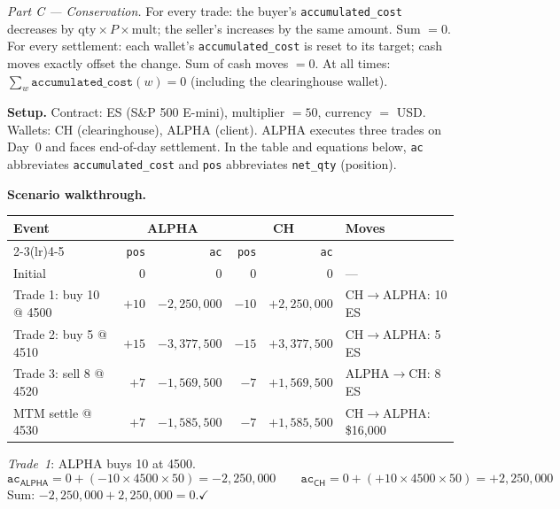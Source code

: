 \documentclass[11pt,a4paper]{article}
\begin{document}
\smallskip
\noindent\emph{Part C --- Conservation.}
For every trade: the buyer's \texttt{accumulated\_cost} decreases by $\text{qty} \times P \times \text{mult}$; the seller's increases by the same amount.  Sum $= 0$.
For every settlement: each wallet's \texttt{accumulated\_cost} is reset to its target; cash moves exactly offset the change.  Sum of cash moves $= 0$.
At all times: $\sum_w \texttt{accumulated\_cost}(w) = 0$ (including the clearinghouse wallet).

\medskip
\noindent\textbf{Setup.}
Contract: ES (S\&P 500 E-mini), multiplier $= 50$, currency $=$ USD.
Wallets: \textsf{CH} (clearinghouse), \textsf{ALPHA} (client).
ALPHA executes three trades on Day~0 and faces end-of-day settlement.
In the table and equations below, \texttt{ac} abbreviates \texttt{accumulated\_cost} and \texttt{pos} abbreviates \texttt{net\_qty} (position).

\medskip
\noindent\textbf{Scenario walkthrough.}

\begin{center}
\small
\begin{tabular}{@{}lrrrrl@{}}
\toprule
\textbf{Event} & \multicolumn{2}{c}{\textsf{ALPHA}} & \multicolumn{2}{c}{\textsf{CH}} & \textbf{Moves} \\
\cmidrule(lr){2-3}\cmidrule(lr){4-5}
 & \texttt{pos} & \texttt{ac} & \texttt{pos} & \texttt{ac} & \\
\midrule
Initial & $0$ & $0$ & $0$ & $0$ & --- \\
Trade 1: buy 10 @ 4500 & $+10$ & $-2{,}250{,}000$ & $-10$ & $+2{,}250{,}000$ & CH${}\to{}$ALPHA: 10 ES \\
Trade 2: buy 5 @ 4510  & $+15$ & $-3{,}377{,}500$ & $-15$ & $+3{,}377{,}500$ & CH${}\to{}$ALPHA: 5 ES \\
Trade 3: sell 8 @ 4520  & $+7$  & $-1{,}569{,}500$ & $-7$  & $+1{,}569{,}500$ & ALPHA${}\to{}$CH: 8 ES \\
\addlinespace
MTM settle @ 4530       & $+7$  & $-1{,}585{,}500$ & $-7$  & $+1{,}585{,}500$ & CH${}\to{}$ALPHA: \$16{,}000 \\
\bottomrule
\end{tabular}
\end{center}

\noindent\emph{Trade~1}: ALPHA buys 10 at 4500.
\[
\texttt{ac}_{\textsf{ALPHA}} = 0 + (-10 \times 4500 \times 50) = -2{,}250{,}000 \qquad
\texttt{ac}_{\textsf{CH}} = 0 + (+10 \times 4500 \times 50) = +2{,}250{,}000
\]
Sum: $-2{,}250{,}000 + 2{,}250{,}000 = 0$.\quad$\checkmark$
\end{document}
